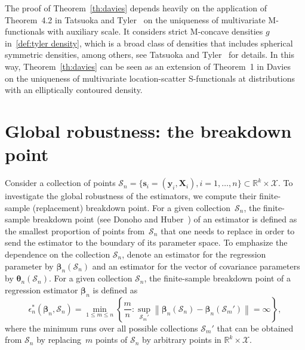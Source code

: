 \documentclass{article}
\numberwithin{equation}{section}
\theoremstyle{plain}
\newcommand{\R}{\mathbb{R}}
\newcommand{\bbeta}{\bm\beta}
\newcommand{\btheta}{\bm\theta}
\newcommand{\by}{\mathbf{y}}
\newcommand{\bs}{\mathbf{s}}
\newcommand{\bX}{\mathbf{X}}
\begin{document}
The proof of Theorem~\ref{th:davies} depends heavily on the application of
Theorem~4.2 in Tatsuoka and Tyler~\cite{tatsuoka&tyler2000} on the uniqueness
of multivariate M-functionals with auxiliary scale.
It considers strict M-concave densities $g$ in~\eqref{def:tyler density}, 
which is a broad class of densities that includes spherical symmetric densities, 
among others, see Tatsuoka and Tyler~\cite{tatsuoka&tyler2000} for details.
In this way, Theorem~\ref{th:davies} can be seen as an extension
of Theorem~1 in Davies~\cite{davies1987} on the uniqueness of multivariate 
location-scatter S-functionals at distributions with an elliptically contoured density.

\section{Global robustness: the breakdown point}
\label{sec:bdp}
Consider a collection of points $\mathcal{S}_n=\{\bs_i=(\by_i,\bX_i),i=1,\ldots,n\}\subset \R^k\times \mathcal{X}$.
To investigate the global robustness of the estimators,
we compute their finite-sample (replacement) breakdown point.
For a given collection~$\mathcal{S}_n$, the finite-sample breakdown point
(see Donoho and Huber~\cite{donoho&huber1983})
of an estimator is defined as the smallest proportion of points
from~$\mathcal{S}_n$ that one needs to replace in order to
send the estimator to the boundary of its parameter space.
To emphasize the dependence on the collection $\mathcal{S}_n$,
denote an estimator for the regression parameter by $\bbeta_n(\mathcal{S}_n)$
and an estimator for the vector of covariance parameters by $\btheta_n(\mathcal{S}_n)$.
For a given collection $\mathcal{S}_n$, the finite-sample breakdown point
of a regression estimator $\bbeta_n$ is defined as
\begin{equation}
\label{def:BDP beta}
\epsilon_n^*(\bbeta_n,\mathcal{S}_n)
=
\min_{1\leq m\leq n}
\left\{
\frac{m}{n}:
\sup_{\mathcal{S}_m'}
\left\|
\bbeta_n(\mathcal{S}_n)-\bbeta_n(\mathcal{S}_m')
\right\|
=\infty
\right\},
\end{equation}
where the minimum runs over all possible collections $\mathcal{S}_m'$ that can be obtained from $\mathcal{S}_n$
by replacing~$m$ points of $\mathcal{S}_n$ by arbitrary points in $\R^k\times \mathcal{X}$.
\end{document}
